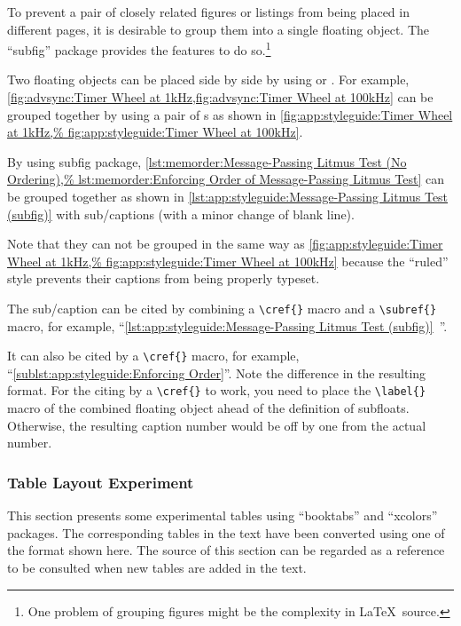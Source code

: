 To prevent a pair of closely related figures or listings
from being placed in different pages, it is desirable to group
them into a single floating object.
The ``subfig'' package provides the features to do so.\footnote{
  One problem of grouping figures might be the complexity in
  \LaTeX\ source.}

Two floating objects can be placed side by side by using
\co{\\parbox} or .
For example,
\cref{fig:advsync:Timer Wheel at 1kHz,fig:advsync:Timer Wheel at 100kHz}
can be grouped together by using a pair of s
as shown in
\cref{fig:app:styleguide:Timer Wheel at 1kHz,%
fig:app:styleguide:Timer Wheel at 100kHz}.

By using subfig package,
\cref{lst:memorder:Message-Passing Litmus Test (No Ordering),%
lst:memorder:Enforcing Order of Message-Passing Litmus Test}
can be grouped together as shown in
\cref{lst:app:styleguide:Message-Passing Litmus Test (subfig)}
with sub\-/captions (with a minor change of blank line).

Note that they can not be grouped in the same way as
\cref{fig:app:styleguide:Timer Wheel at 1kHz,%
fig:app:styleguide:Timer Wheel at 100kHz}
because the ``ruled'' style prevents their captions
from being properly typeset.

The sub\-/caption can be cited by combining a \verb|\cref{}| macro
and a \verb|\subref{}| macro, for example,
``\cref{lst:app:styleguide:Message-Passing Litmus Test (subfig)}\,%
''.

It can also be cited by a \verb|\cref{}| macro, for example,
``\cref{sublst:app:styleguide:Enforcing Order}''.
Note the difference in the resulting format.
For the citing by a \verb|\cref{}| to work, you need to place
the \verb|\label{}| macro of the combined floating object
ahead of the definition of subfloats.
Otherwise, the resulting caption number would be off by one
from the actual number.

\subsubsection{Table Layout Experiment}
\label{sec:app:styleguide:Table Layout Experiment}

This section presents some experimental tables
using ``booktabs'' and ``xcolors'' packages.
The corresponding tables in the text have been converted using one of
the format shown here.
The source of this section can be regarded as a reference to be
consulted when new tables are added in the text.

